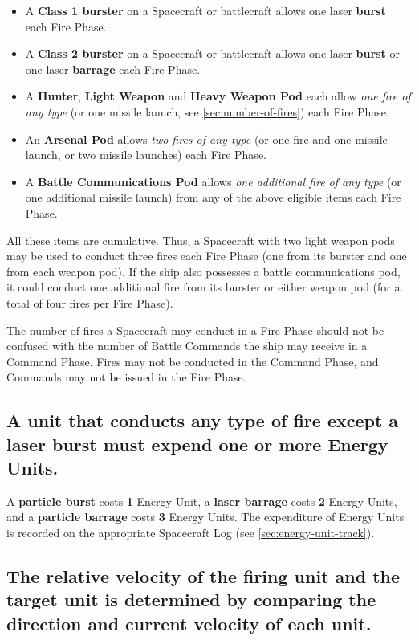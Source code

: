 \begin{itemize}
\item A \textbf{Class 1 burster} on a Spacecraft or battlecraft allows
  one laser \textbf{burst} each Fire Phase.
\item A \textbf{Class 2 burster} on a Spacecraft or battlecraft allows
  one laser \textbf{burst} or one laser \textbf{barrage} each Fire
  Phase.
\item A \textbf{Hunter}, \textbf{Light Weapon} and \textbf{Heavy
    Weapon Pod} each allow \emph{one fire of any type} (or one missile
  launch, see \ref{sec:number-of-fires}) each Fire Phase.
\item An \textbf{Arsenal Pod} allows \emph{two fires of any type} (or
  one fire and one missile launch, or two missile launches) each Fire
  Phase.
\item A \textbf{Battle Communications Pod} allows \emph{one additional
    fire of any type} (or one additional missile launch) from any of
  the above eligible items each Fire Phase.
\end{itemize}

All these items are cumulative. Thus, a Spacecraft with two light
weapon pods may be used to conduct three fires each Fire Phase (one
from its burster and one from each weapon pod). If the ship also
possesses a battle communications pod, it could conduct one additional
fire from its burster or either weapon pod (for a total of four fires
per Fire Phase).

The number of fires a Spacecraft may conduct in a Fire Phase should
not be confused with the number of Battle Commands the ship may
receive in a Command Phase. Fires may not be conducted in the Command
Phase, and Commands may not be issued in the Fire Phase.


\subsection[Fire And Energy Expenditure]{A unit that conducts any type
  of fire except a laser burst 
  must expend one or more Energy Units.}
\label{sec:fire-energy}



A \textbf{particle burst} costs \textbf{1} Energy Unit, a
\textbf{laser barrage} costs \textbf{2} Energy Units, and a
\textbf{particle barrage} costs \textbf{3} Energy Units. The
expenditure of Energy Units is recorded on the appropriate Spacecraft
Log (see \ref{sec:energy-unit-track}).


\subsection[Relative Velocity]{The relative velocity of the firing unit
  and the target unit is determined by comparing the direction and  
  current velocity of each unit.}
\label{sec:relative-velocity}

